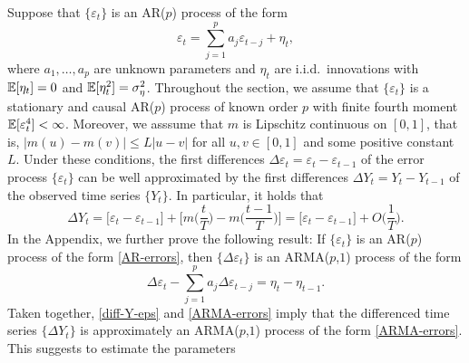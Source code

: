 Suppose that $\{\varepsilon_t\}$ is an AR($p$) process of the form
\begin{equation}\label{AR-errors}
\varepsilon_t = \sum_{j=1}^p a_j \varepsilon_{t-j} + \eta_t,
\end{equation}
where $a_1,\ldots,a_p$ are unknown parameters and $\eta_t$ are i.i.d.\ 
innovations with $\mathbb{E}[\eta_t] = 0$ and $\mathbb{E}[\eta_t^2] = \sigma_\eta^2$. 
Throughout the section, we assume that $\{\varepsilon_t\}$ is a stationary 
and causal AR($p$) process of known order $p$ with finite fourth moment 
$\mathbb{E}[\varepsilon_t^4] < \infty$. Moreover, we asssume that $m$ is Lipschitz 
continuous on $[0,1]$, that is, $|m(u) - m(v)| \le L|u-v|$ for all $u,v \in 
[0,1]$ and some positive constant $L$. Under these conditions, the first 
differences $\Delta \varepsilon_t = \varepsilon_t - \varepsilon_{t-1}$ of 
the error process $\{ \varepsilon_t \}$ can be well approximated by the 
first differences $\Delta Y_t = Y_t - Y_{t-1}$ of the
observed time series $\{Y_t\}$. In particular, it holds that
\begin{equation}\label{diff-Y-eps}
\Delta Y_t = \big[\varepsilon_t  - \varepsilon_{t-1} \big] + \Big[ m 
\Big(\frac{t}{T}\Big) - m \Big(\frac{t-1}{T}\Big) \Big] = \big[ 
\varepsilon_t  - \varepsilon_{t-1} \big] + O \Big( \frac{1}{T} \Big). 
\end{equation}
In the Appendix, we further prove the following result: If 
$\{\varepsilon_t\}$ is an AR($p$) process of the form \eqref{AR-errors}, 
then $\{ \Delta \varepsilon_t \}$ is an ARMA($p$,$1$) process of the form
\begin{equation}\label{ARMA-errors}
\Delta \varepsilon_t - \sum_{j=1}^p a_j \Delta \varepsilon_{t-j} = \eta_t - 
\eta_{t-1}.
\end{equation}
Taken together, \eqref{diff-Y-eps} and \eqref{ARMA-errors} imply that the 
differenced time series $\{ \Delta Y_t \}$ is approximately an ARMA($p$,$1$) 
process of the form \eqref{ARMA-errors}. This suggests to estimate the 
parameters

